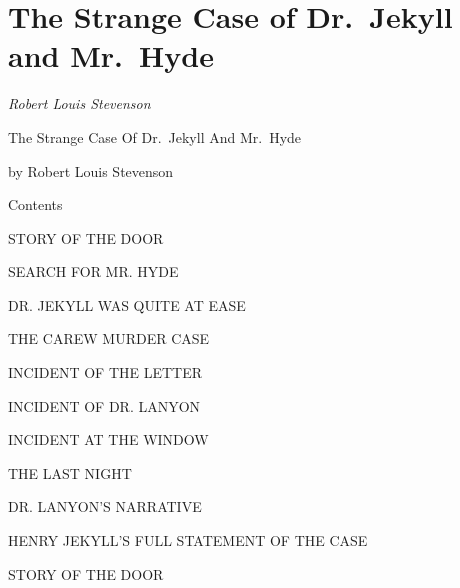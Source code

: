 \documentclass[12pt,openright]{book}
\begin{document}

%



\mainmatter
\pagestyle{fancy}


\chapter*{The Strange Case of Dr. Jekyll and Mr. Hyde}

\textit{Robert Louis Stevenson}

The Strange Case Of Dr. Jekyll And Mr. Hyde

by Robert Louis Stevenson

Contents

STORY OF THE DOOR

SEARCH FOR MR. HYDE

DR. JEKYLL WAS QUITE AT EASE

THE CAREW MURDER CASE

INCIDENT OF THE LETTER

INCIDENT OF DR. LANYON

INCIDENT AT THE WINDOW

THE LAST NIGHT

DR. LANYON’S NARRATIVE

HENRY JEKYLL’S FULL STATEMENT OF THE CASE

STORY OF THE DOOR
\end{document}
